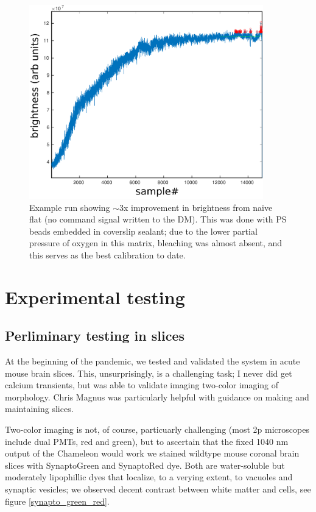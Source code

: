 \documentclass[a4paper,12pt]{article}
\begin{document}
\begin{figure}
\centering
\includegraphics[width=4in]{PSbeads_optimization_run.pdf}
\caption{Example run showing $\sim$3x improvement in brightness from naive flat (no command signal written to the DM).  This was done with PS beads embedded in coverslip sealant; due to the lower partial pressure of oxygen in this matrix, bleaching was almost absent, and this serves as the best calibration to date.}
\end{figure}

\section{Experimental testing}

\subsection{Perliminary testing in slices}

At the beginning of the pandemic, we tested and validated the system in acute mouse brain slices.  This, unsurprisingly, is a challenging task; I never did get calcium transients, but was able to validate imaging two-color imaging of morphology. Chris Magnus was particularly helpful with guidance on making and maintaining slices. 

Two-color imaging is not, of course, particuarly challenging (most 2p microscopes include dual PMTs, red and green), but to ascertain that the fixed 1040 nm output of the Chameleon would work we stained wildtype mouse coronal brain slices with SynaptoGreen and SynaptoRed dye.  Both are water-soluble but moderately lipophillic dyes that localize, to a verying extent, to vacuoles and synaptic vesicles; we observed decent contrast between white matter and cells, see figure \ref{synapto_green_red}. 
\end{document}

